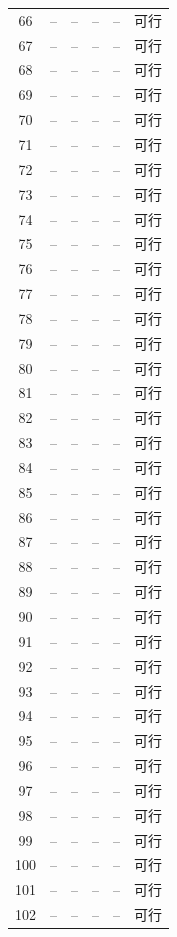 \begin{longtable}{cccccc}
66 & -- & -- & -- & -- & 可行\\
67 & -- & -- & -- & -- & 可行\\
68 & -- & -- & -- & -- & 可行\\
69 & -- & -- & -- & -- & 可行\\
70 & -- & -- & -- & -- & 可行\\
71 & -- & -- & -- & -- & 可行\\
72 & -- & -- & -- & -- & 可行\\
73 & -- & -- & -- & -- & 可行\\
74 & -- & -- & -- & -- & 可行\\
75 & -- & -- & -- & -- & 可行\\
76 & -- & -- & -- & -- & 可行\\
77 & -- & -- & -- & -- & 可行\\
78 & -- & -- & -- & -- & 可行\\
79 & -- & -- & -- & -- & 可行\\
80 & -- & -- & -- & -- & 可行\\
81 & -- & -- & -- & -- & 可行\\
82 & -- & -- & -- & -- & 可行\\
83 & -- & -- & -- & -- & 可行\\
84 & -- & -- & -- & -- & 可行\\
85 & -- & -- & -- & -- & 可行\\
86 & -- & -- & -- & -- & 可行\\
87 & -- & -- & -- & -- & 可行\\
88 & -- & -- & -- & -- & 可行\\
89 & -- & -- & -- & -- & 可行\\
90 & -- & -- & -- & -- & 可行\\
91 & -- & -- & -- & -- & 可行\\
92 & -- & -- & -- & -- & 可行\\
93 & -- & -- & -- & -- & 可行\\
94 & -- & -- & -- & -- & 可行\\
95 & -- & -- & -- & -- & 可行\\
96 & -- & -- & -- & -- & 可行\\
97 & -- & -- & -- & -- & 可行\\
98 & -- & -- & -- & -- & 可行\\
99 & -- & -- & -- & -- & 可行\\
100 & -- & -- & -- & -- & 可行\\
101 & -- & -- & -- & -- & 可行\\
102 & -- & -- & -- & -- & 可行\\

\end{longtable}
